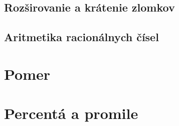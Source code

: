 \subsection{Rozširovanie a krátenie zlomkov}

\subsection{Aritmetika racionálnych čísel}

\newpage
	
\section{Pomer}
	
\section{Percentá a promile}

